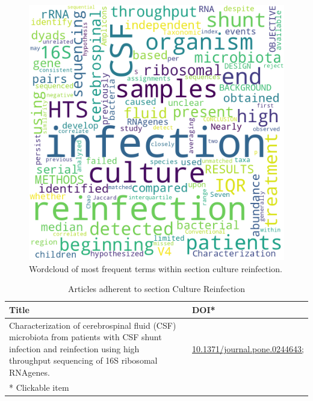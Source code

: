 \documentclass{qqtarticle}
\begin{document}
    \begin{figure}[H]
        \centering
        \includegraphics[width=.75\linewidth]{img/culturereinfection.png}
        \caption{Wordcloud of most frequent terms within section culture reinfection.}
        \label{fig:wcl_culturereinfection}
    \end{figure}

    \begin{table}[H]
    \scriptsize
    \centering
    \caption{Articles adherent to section Culture Reinfection}
    \renewcommand{\arraystretch}{1.5}
    \begin{tabular}{p{}l}
        \toprule 
        Title & DOI* \\     \midrule Characterization of cerebrospinal fluid (CSF) microbiota from patients with CSF shunt infection and reinfection using high throughput sequencing of 16S ribosomal RNAgenes. \cite{Characterice73373c} & \href{https://dx.doi.org/10.1371/journal.pone.0244643; }{10.1371/journal.pone.0244643; }\\     \midrule
        * Clickable item \\
        \bottomrule
    \end{tabular}
    \label{tab:topic3}
    \end{table}
    
\end{document}
